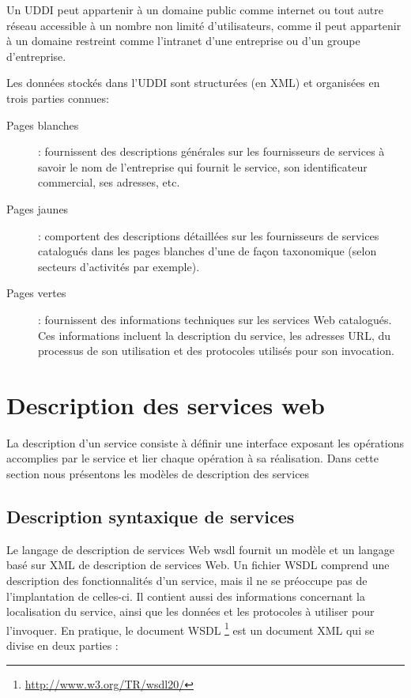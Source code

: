 	Un \textsc{UDDI} peut appartenir à un domaine public comme internet ou tout autre réseau accessible à un nombre
       	non limité d’utilisateurs, comme il peut appartenir à un domaine restreint comme l'intranet d’une entreprise 
	ou d'un groupe d'entreprise.

	Les données stockés dans l'UDDI sont structurées (en \textsc{XML}) et organisées en trois parties 
	connues:

	\begin{description} %
	    \item[Pages blanches]:
		fournissent des descriptions générales sur les fournisseurs de services à savoir le nom de 
		l'entreprise qui fournit le service, son identificateur commercial, ses adresses, etc.

	    \item[Pages jaunes]:
		comportent des descriptions détaillées sur les fournisseurs de services catalogués dans les pages 
		blanches d'une de façon taxonomique (selon secteurs d'activités par exemple).

	    \item[Pages vertes]:
		fournissent des informations techniques sur les services Web catalogués. Ces informations incluent 
		la description du service, les adresses \textsc{URL}, du processus de son utilisation 
		et des protocoles utilisés pour son invocation.

	\end{description}


\section{Description des services web} 
    La description d’un service consiste à définir une interface exposant les opérations accomplies par le service et 
    lier chaque opération à sa réalisation. Dans cette section nous présentons les modèles de description des services

    \cite{medjahed2004thesis}
    	\subsection{Description syntaxique de services}
	 \cite{baryannis2010}
	 Le langage de description de services Web \acrshort{wsdl} \cite{chinnici2007web} fournit un modèle et un
	 langage basé sur \textsc{XML} de description de services Web.  Un fichier \textsc{WSDL} comprend une 
	 description des fonctionnalités d'un service, mais il ne se préoccupe pas de l'implantation de celles-ci. 
	 Il contient aussi des informations concernant la localisation du service, ainsi que les données et les 
	 protocoles à utiliser pour l'invoquer. En pratique, le document \textsc{WSDL}
	 \footnote{\url{http://www.w3.org/TR/wsdl20/}} est un document \textsc{XML} qui se divise en 
	 deux parties \cite{elie2010}:

